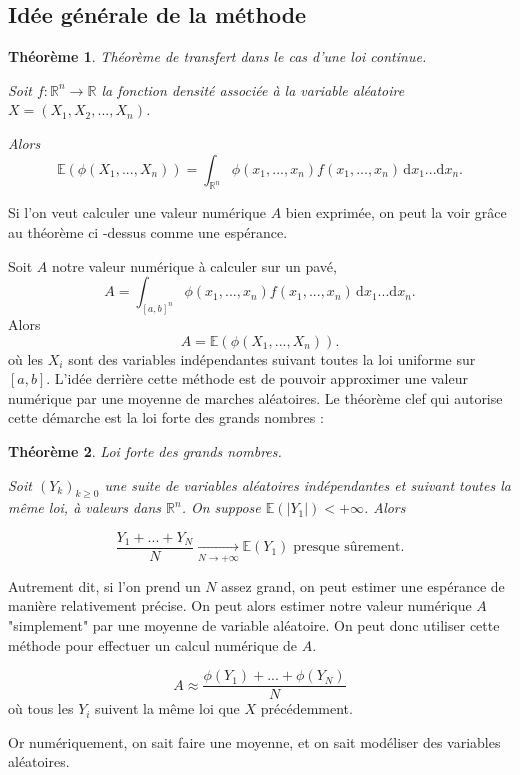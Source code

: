 \documentclass[12pt, a4paper]{article}
\newtheorem*{theo}{Théorème} %
\begin{document}
\subsection{Idée générale de la méthode}

\begin{theo}
    Théorème de transfert dans le cas d'une loi continue.

    Soit $f : \mathbb{R}^n \rightarrow \mathbb{R}$ la fonction densité associée à la variable
    aléatoire $X = (X_1, X_2,...,X_n)$.

    Alors\[ \mathbb{E} \left( \phi(X_1, ..., X_n) \right) =  \int_{\mathbb{R}^n}
    \phi(x_1,...,x_n)f(x_1,...,x_n) \, \mathrm{d}x_1...\mathrm{d}x_n.  \] 
\end{theo}

Si l'on veut calculer une valeur numérique $A$ bien exprimée, on peut la voir grâce au théorème ci
-dessus comme une espérance.

Soit $A$ notre valeur numérique à calculer sur un pavé, \[ A = \int_{[a,b]^n}
\phi(x_1,...,x_n)f(x_1,...,x_n) \, \mathrm{d}x_1...\mathrm{d}x_n.  \] Alors \[ A = \mathbb{E} \left(
\phi(X_1, ..., X_n) \right).  \] où les $X_i$ sont des variables indépendantes suivant toutes la loi
uniforme sur $[a,b]$.  \medbreak L'idée derrière cette méthode est de pouvoir approximer une valeur
numérique par une moyenne de marches aléatoires. Le théorème clef qui autorise cette démarche est la
loi forte des grands nombres :

\begin{theo} Loi forte des grands nombres.

    Soit $(Y_k)_{k\ge 0}$ une suite de variables aléatoires indépendantes et suivant toutes la même
    loi, à valeurs dans $\mathbb{R}^n$. On suppose $\mathbb{E}(|Y_1|) < +\infty $. Alors

    \[ \frac{Y_1+...+Y_N}{N}\underset{N\to+\infty}{\longrightarrow}\mathbb{E}(Y_1)\; \text{presque
    sûrement.} \]
\end{theo}

Autrement dit, si l'on prend un $N$ assez grand, on peut estimer une espérance de manière
relativement précise. On peut alors estimer notre valeur numérique $A$ "simplement" par une moyenne
de variable aléatoire. On peut donc utiliser cette méthode pour effectuer un calcul numérique de
$A$.

\[ A \approx \frac{\phi(Y_1)+...+\phi(Y_N)}{N} \] où tous les $Y_i$ suivent la même loi que $X$
précédemment.

Or numériquement, on sait faire une moyenne, et on sait modéliser des variables aléatoires.
\end{document}
